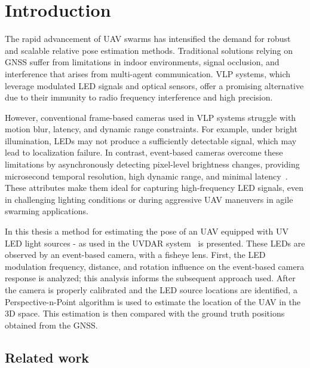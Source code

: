 
\chapter{Introduction\label{chap:introduction}}

The rapid advancement of \ac{UAV} swarms has intensified the demand for robust and scalable relative pose estimation methods.
Traditional solutions relying on \ac{GNSS} suffer from limitations in indoor environments, signal occlusion, and interference that arises from
multi-agent communication.
\ac{VLP} systems, which leverage modulated \ac{LED} signals and optical sensors, offer a promising alternative due to their immunity to radio
frequency interference and high precision.

However, conventional frame-based cameras used in \ac{VLP} systems struggle with motion blur, latency,
and dynamic range constraints. For example, under bright illumination, \ac{LED}s may not produce a sufficiently detectable signal,
which may lead to localization failure. In contrast, event-based cameras overcome these limitations by asynchronously detecting pixel-level
brightness changes, providing microsecond temporal resolution, high dynamic range, and minimal latency~\cite{gallego22event}. These attributes make them ideal for
capturing high-frequency LED signals, even in challenging lighting conditions or during aggressive \ac{UAV} maneuvers in agile swarming applications.

In this thesis a method for estimating the pose of an \ac{UAV} equipped with \ac{UV} \ac{LED} light sources - as used
in the UVDAR system~\cite{walteruvdar} is presented. These \ac{LED}s are observed by an event-based camera, with a fisheye lens. 
First, the \ac{LED} modulation frequency, distance, and rotation influence on the event-based camera response is analyzed;
this analysis informs the subsequent approach used.
After the camera is properly calibrated and the LED source locations are identified, a Perspective-n-Point 
algorithm is used to estimate the location of the \ac{UAV} in the 3D space. This estimation is then compared with the ground truth positions obtained
from the \ac{GNSS}.


\section{Related work}

